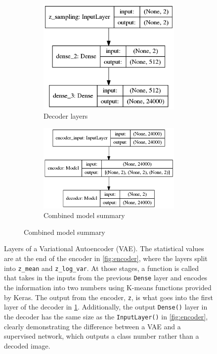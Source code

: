 \documentclass[a4paper]{article}
\begin{document}
\begin{figure}[h!]
\begin{subfigure}{.49\textwidth}
\begin{subfigure}{.6\textwidth}
			\includegraphics[width=1\linewidth]{vae_mlp_decoder}
			\caption{Decoder layers}
			\label{fig:vae_decoder}
		\end{subfigure}
		\vspace{10mm}%
		\begin{subfigure}{.8\textwidth}
			\centering
			\includegraphics[width=1\linewidth]{vae_mlp}
			\caption{Combined model summary}
			\label{fig:vae_mlp}
		\end{subfigure}
		\label{fig:decoder}
	\end{subfigure}
	
	\caption{Layers of a Variational Autoencoder (VAE). The statistical values are at the end of the encoder in \ref{fig:encoder}, where the layers split into \texttt{z\_mean} and \texttt{z\_log\_var}. At those stages, a function is called that takes in the inputs from the previous \texttt{Dense} layer and encodes the information into two numbers using K-means functions provided by Keras. The output from the encoder, \texttt{z}, is what goes into the first layer of the decoder in \ref{fig:vae_decoder}. Additionally, the output \texttt{Dense()} layer in the decoder has the same size as the \texttt{InputLayer()} in \ref{fig:encoder}, clearly demonstrating the difference between a VAE and a supervised network, which outputs a class number rather than a decoded image.}
	\label{fig:vae}
\end{figure} 
\end{document}
